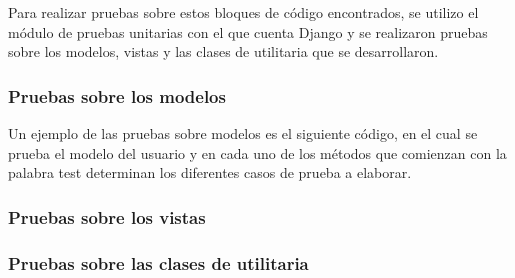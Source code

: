 Para realizar pruebas sobre estos bloques de código encontrados, se utilizo el módulo de pruebas unitarias con el que cuenta Django y se realizaron pruebas sobre los modelos, vistas y las clases de utilitaria que se desarrollaron.

\subsubsection{Pruebas sobre los modelos}

Un ejemplo de las pruebas sobre modelos es el siguiente código, en el cual se prueba el modelo del usuario y en cada uno de los métodos que comienzan con la palabra test determinan los diferentes casos de prueba a elaborar.

\subsubsection{Pruebas sobre los vistas}
\subsubsection{Pruebas sobre las clases de utilitaria}

